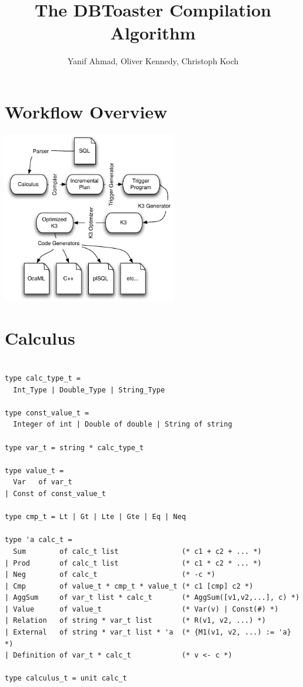 \documentclass[11pt]{amsart}
\title{The DBToaster Compilation Algorithm}
\author{Yanif Ahmad, Oliver Kennedy, Christoph Koch}
\begin{document}
\maketitle

\section{Workflow Overview}

\includegraphics[width=3in]{CompilerFlow}


\section{Calculus}

\begin{verbatim}

type calc_type_t = 
  Int_Type | Double_Type | String_Type

type const_value_t = 
  Integer of int | Double of double | String of string

type var_t = string * calc_type_t

type value_t = 
  Var   of var_t
| Const of const_value_t

type cmp_t = Lt | Gt | Lte | Gte | Eq | Neq

type 'a calc_t =
  Sum        of calc_t list               (* c1 + c2 + ... *)
| Prod       of calc_t list               (* c1 * c2 * ... *)
| Neg        of calc_t                    (* -c *)
| Cmp        of value_t * cmp_t * value_t (* c1 [cmp] c2 *)
| AggSum     of var_t list * calc_t       (* AggSum([v1,v2,...], c) *)
| Value      of value_t                   (* Var(v) | Const(#) *)
| Relation   of string * var_t list       (* R(v1, v2, ...) *)
| External   of string * var_t list * 'a  (* {M1(v1, v2, ...) := 'a} *)
| Definition of var_t * calc_t            (* v <- c *)

type calculus_t = unit calc_t
\end{verbatim}
\end{document}
